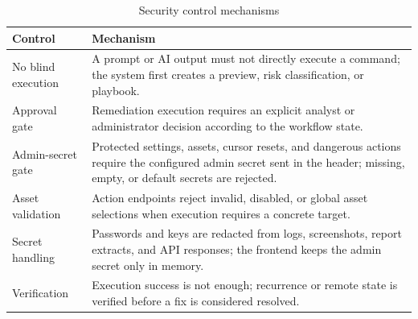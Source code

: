 \begin{table}[H]
\centering
\caption{Security control mechanisms}
\begin{tabularx}{\textwidth}{@{}p{}Y@{}}
\toprule
\textbf{Control} & \textbf{Mechanism} \\
\midrule
No blind execution & A prompt or AI output must not directly execute a command; the system first creates a preview, risk classification, or playbook. \\
Approval gate & Remediation execution requires an explicit analyst or administrator decision according to the workflow state. \\
Admin-secret gate & Protected settings, assets, cursor resets, and dangerous actions require the configured admin secret sent in the  header; missing, empty, or default secrets are rejected. \\
Asset validation & Action endpoints reject invalid, disabled, or global asset selections when execution requires a concrete target. \\
Secret handling & Passwords and keys are redacted from logs, screenshots, report extracts, and API responses; the frontend keeps the admin secret only in memory. \\
Verification & Execution success is not enough; recurrence or remote state is verified before a fix is considered resolved. \\
\bottomrule
\end{tabularx}
\end{table}


